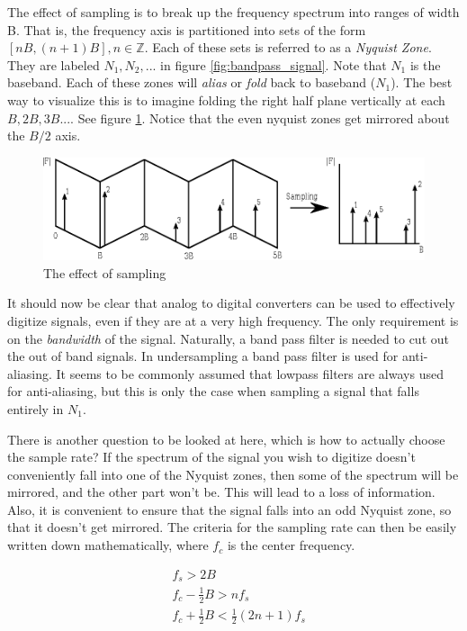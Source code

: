 \documentclass[a4paper, 12pt]{article}
\begin{document}
The effect of sampling is to break up the frequency spectrum into ranges of width B.  That is, the frequency axis is partitioned into sets of the form $[nB, (n+1)B], n \in \mathbb{Z}$.  Each of these sets is referred to as a \textit{Nyquist Zone}.  They are labeled $N_1, N_2, ...$ in figure \ref{fig:bandpass_signal}.  Note that $N_1$ is the baseband.  Each of these zones will \textit{alias} or \textit{fold} back to baseband ($N_1$).  The best way to visualize this is to imagine folding the right half plane vertically at each $B, 2B, 3B ...$.  See figure \ref{fig:bandpass_sampling}.  Notice that the even nyquist zones get mirrored about the $B/2$ axis.

\begin{figure}[ht]
\caption{The effect of sampling}
\label{fig:bandpass_sampling}
\centering
\includegraphics[width=13cm]{images/bandpass_sampling.eps}
\end{figure}

It should now be clear that analog to digital converters can be used to effectively digitize signals, even if they are at a very high frequency.  The only requirement is on the \textit{bandwidth} of the signal.  Naturally, a band pass filter is needed to cut out the out of band signals.  In undersampling a band pass filter is used for anti-aliasing. It seems to be commonly assumed that lowpass filters are always used for anti-aliasing, but this is only the case when sampling a signal that falls entirely in $N_1$.

There is another question to be looked at here, which is how to actually choose the sample rate?  If the spectrum of the signal you wish to digitize doesn't conveniently fall into one of the Nyquist zones, then some of the spectrum will be mirrored, and the other part won't be.  This will lead to a loss of information.  Also, it is convenient to ensure that the signal falls into an odd Nyquist zone, so that it doesn't get mirrored.  The criteria for the sampling rate can then be easily written down mathematically, where $f_c$ is the center frequency.

\begin{equation}
\label{eq:sample_rate}
\begin{aligned}
  &f_s > 2B \\
  &f_c - \frac{1}{2}B > nf_s \\
  &f_c + \frac{1}{2}B < \frac{1}{2}(2n + 1)f_s \\
\end{aligned}
\end{equation}
\end{document}
